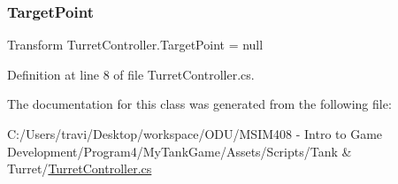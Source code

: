 \subsubsection{\texorpdfstring{Target\+Point}{TargetPoint}}
{\footnotesize\ttfamily Transform Turret\+Controller.\+Target\+Point = null}



Definition at line 8 of file Turret\+Controller.\+cs.



The documentation for this class was generated from the following file\+:\begin{DoxyCompactItemize}
\item 
C\+:/\+Users/travi/\+Desktop/workspace/\+O\+D\+U/\+M\+S\+I\+M408 -\/ Intro to Game Development/\+Program4/\+My\+Tank\+Game/\+Assets/\+Scripts/\+Tank \& Turret/\hyperlink{_turret_controller_8cs}{Turret\+Controller.\+cs}\end{DoxyCompactItemize}
